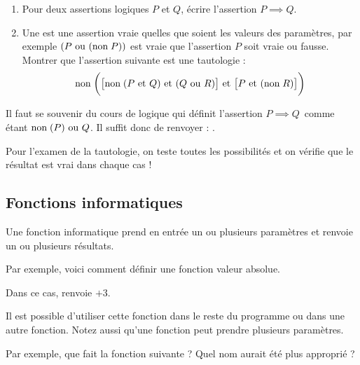 \documentclass[class=report,crop=false]{standalone}
\begin{document}
\begin{tp}
\sauteligne
\begin{enumerate}
  \item Pour deux assertions logiques $P$ et $Q$, écrire l'assertion $P\implies Q$.
  
  \item Une  est une assertion vraie quelles que soient les valeurs des paramètres,
  par exemple $(P \text{ ou } (\text{non\;} P))$ est vraie que l'assertion $P$ soit vraie ou fausse.
  Montrer que l'assertion suivante est une tautologie :
  $$\text{non\;} \bigg( \big[\text{non\;}(P \text{ et } Q)  \text{ et } (Q \text{ ou } R) \big] 
  \text{ et } \big[P \text{ et } (\text{non\;} R)\big] \bigg)$$
\end{enumerate}
  
\end{tp}

Il faut se souvenir du cours de logique qui définit l'assertion
\og$P\implies Q$\fg\ comme étant \og$\text{non\;}(P) \text{ ou } Q$\fg.
Il suffit donc de renvoyer : .


Pour l'examen de la tautologie, on teste toutes les possibilités et on 
vérifie que le résultat est vrai dans chaque cas !


\subsection{Fonctions informatiques}

Une fonction informatique prend en entrée un ou plusieurs paramètres
et renvoie un ou plusieurs résultats.


Par exemple, voici comment définir une fonction valeur absolue.

Dans ce cas,  renvoie $+3$.

Il est possible d'utiliser cette fonction dans le reste du programme ou dans une autre fonction.
Notez aussi qu'une fonction peut prendre plusieurs paramètres.

Par exemple, que fait la fonction suivante ? Quel nom aurait été plus approprié ?

\end{document}
